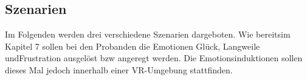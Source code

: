 \subsection{Szenarien} \label{szenarien-subsec}



Im Folgenden werden drei verschiedene Szenarien dargeboten. 
Wie bereitsim Kapitel 7 sollen bei den Probanden die Emotionen Gl{\"u}ck, Langweile undFrustration ausgel{\"o}st bzw angeregt werden. 
Die Emotionsinduktionen sollen dieses Mal jedoch innerhalb einer VR-Umgebung stattfinden.







